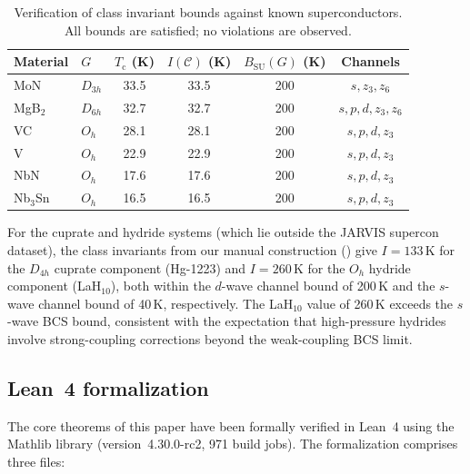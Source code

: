 \documentclass[12pt,a4paper]{article}
\theoremstyle{plain}
\theoremstyle{definition}
\theoremstyle{remark}
\newcommand{\Tc}{T_{\mathrm{c}}}
\begin{document}
\begin{table}[H]
\centering
\caption{Verification of class invariant bounds against known
superconductors.  All bounds are satisfied; no violations are observed.}
\label{tab:verification}
\begin{tabular}{@{}llcccc@{}}
\toprule
Material & $G$ & $\Tc$ (K) & $I(\mathcal{C})$ (K)
  & $B_{\mathrm{SU}}(G)$ (K) & Channels \\
\midrule
MoN     & $D_{3h}$ & 33.5 & 33.5 & 200  & $s, z_3, z_6$ \\
MgB$_2$ & $D_{6h}$ & 32.7 & 32.7 & 200  & $s, p, d, z_3, z_6$ \\
VC      & $O_h$    & 28.1 & 28.1 & 200  & $s, p, d, z_3$ \\
V       & $O_h$    & 22.9 & 22.9 & 200  & $s, p, d, z_3$ \\
NbN     & $O_h$    & 17.6 & 17.6 & 200  & $s, p, d, z_3$ \\
Nb$_3$Sn & $O_h$   & 16.5 & 16.5 & 200  & $s, p, d, z_3$ \\
\bottomrule
\end{tabular}
\end{table}

\noindent
For the cuprate and hydride systems (which lie outside the JARVIS supercon
dataset), the class invariants from our manual construction
() give $I = 133$\,K for the $D_{4h}$ cuprate
component (Hg-1223) and $I = 260$\,K for the $O_h$ hydride component
(LaH$_{10}$), both within the $d$-wave channel bound of 200\,K and the
$s$-wave channel bound of 40\,K, respectively.  The LaH$_{10}$ value of
260\,K exceeds the $s$-wave BCS bound, consistent with the expectation
that high-pressure hydrides involve strong-coupling corrections beyond
the weak-coupling BCS limit.

\subsection{Lean~4 formalization}

The core theorems of this paper have been formally verified in Lean~4
using the Mathlib library (version~4.30.0-rc2, 971 build jobs).  The
formalization comprises three files:
\end{document}

